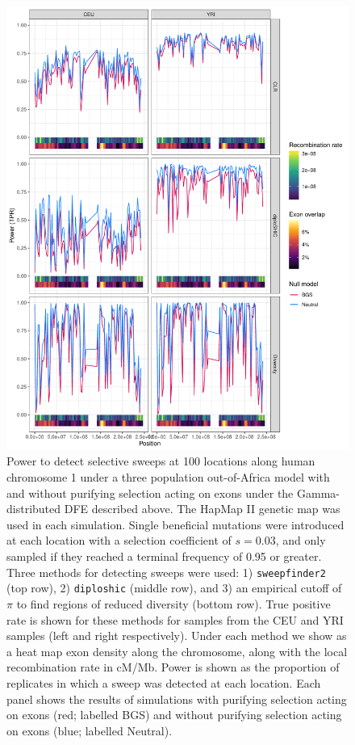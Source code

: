 \documentclass[hidelinks]{article}
\newcommand{\sweepfinder}{\texttt{sweepfinder2}\xspace}
\newcommand{\diploshic}{\texttt{diploshic}\xspace}
\begin{document}
    \begin{figure}
        \centering
        \includegraphics[width=0.8 \textwidth]{figures/sweeps/chr1_power.pdf}
        \caption{
        Power to detect selective sweeps at 100 locations along human chromosome 1 under a three population out-of-Africa model \citep{gutenkunst2009inferring}  
        with and without purifying selection acting on exons under the Gamma-distributed DFE described above. 
        The HapMap II genetic map \citep{international2007second} was used in each simulation. 
        Single beneficial mutations were introduced at each location with a selection coefficient of $s = 0.03$,
        and only sampled if they reached a terminal frequency of 0.95 or greater. 
        Three methods for detecting sweeps were used: 1) \sweepfinder \citep{degiorgio2016sweepfinder2} (top row), 
        2) \diploshic \citep{kern2018diplos} (middle row), and 3) an empirical cutoff of $\pi$ to find regions of reduced diversity (bottom row).
        True positive rate is shown for these methods for samples from the CEU and YRI samples (left and right respectively). 
        Under each method we show as a heat map exon density along the chromosome, along with the local recombination rate in cM/Mb.
        Power is shown as the proportion of replicates in which a sweep was detected at each location. 
        Each panel shows the results of simulations with purifying selection acting on exons (red; labelled BGS)
        and without purifying selection acting on exons (blue; labelled Neutral).
        }
        \label{fig:chr1_power}
    \end{figure}
    
\end{document}
